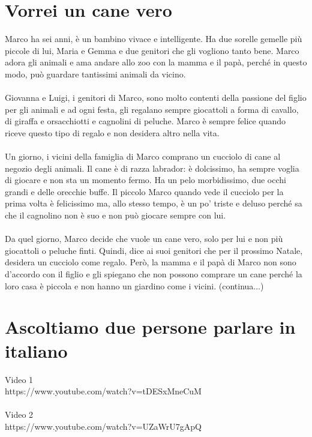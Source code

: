 \documentclass[letter,11pt]{article}
\begin{document}
\section*{Vorrei un cane vero}
\vskip 0.2in

\noindent Marco ha sei anni, è un bambino vivace e intelligente. Ha due sorelle gemelle più piccole di lui, Maria e Gemma e due genitori che gli vogliono tanto bene. Marco adora gli animali e ama andare allo zoo con la mamma e il papà, perché in questo modo, può guardare tantissimi animali da vicino.  \\
\\
\noindent Giovanna e Luigi, i genitori di Marco, sono molto contenti della passione del figlio per gli animali e ad ogni festa, gli regalano sempre giocattoli a forma di cavallo, di giraffa e orsacchiotti e cagnolini di peluche. Marco è sempre felice quando riceve questo tipo di regalo e non desidera altro nella vita.\\
\\
\noindent Un giorno, i vicini della famiglia di Marco comprano un cucciolo di cane al negozio degli animali. Il cane è di razza labrador: è dolcissimo, ha sempre voglia di giocare e non sta un momento fermo. Ha un pelo morbidissimo, due occhi grandi e delle orecchie buffe. Il piccolo Marco quando vede il cucciolo per la prima volta è felicissimo ma, allo stesso tempo, è un po’ triste e deluso perché sa che il cagnolino non è suo e non può giocare sempre con lui.\\
\\
\noindent Da quel giorno, Marco decide che vuole un cane vero, solo per lui e non più giocattoli o peluche finti. Quindi, dice ai suoi genitori che per il prossimo Natale, desidera un cucciolo come regalo. Però, la mamma e il papà di Marco non sono d’accordo con il figlio e gli spiegano che non possono comprare un cane perché la loro casa è piccola e non hanno un giardino come i vicini. (continua...)

\vskip 0.2in
\section*{Ascoltiamo due persone parlare in italiano}
Video 1 \\
https://www.youtube.com/watch?v=tDESxMneCuM \\
\\
Video 2 \\
https://www.youtube.com/watch?v=UZaWrU7gApQ \\
\end{document}
